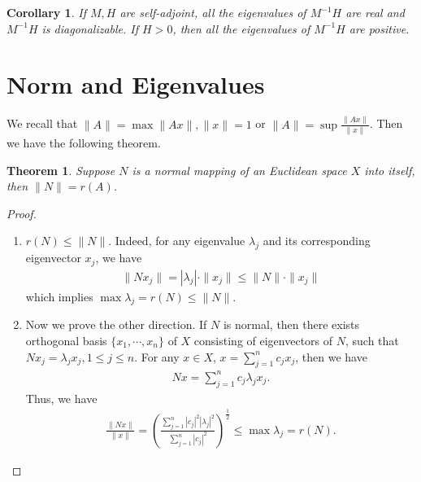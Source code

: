 \documentclass[11pt]{book}
\newtheorem{theorem}{Theorem}[section]
\newtheorem{corollary}{Corollary}[theorem]
\theoremstyle{definition}
\numberwithin{equation}{chapter}
\begin{document}
\medskip

\begin{corollary}
If $M,H$ are self-adjoint, all the eigenvalues of $M^{-1}H$ are real and $M^{-1}H$ is diagonalizable. If $H > 0$, then all the eigenvalues of $M^{-1}H$ are positive.
\end{corollary}

\medskip

\section{Norm and Eigenvalues}

We recall that $\|A\| = \max \|Ax\|, \|x\|=1$ or $\|A\| = \sup\frac{\|Ax\|}{\|x\|}$. Then we have the following theorem.

\medskip

\begin{theorem}
Suppose $N$ is a normal mapping of an Euclidean space $X$ into itself, then $\|N\| = r(A)$.
\end{theorem}
\begin{proof}
~\begin{enumerate}[label=(\alph*)]
    \item $r(N)\leq \|N\|$. Indeed, for any eigenvalue $\lambda_j$ and its corresponding eigenvector $x_j$, we have \begin{align*}
        \|Nx_j\| = |\lambda_j|\cdot \|x_j\|\leq \|N\|\cdot \|x_j\|
    \end{align*}
    which implies $\max \lambda_j = r(N) \leq \|N\|$.
    \item Now we prove the other direction. If $N$ is normal, then there exists orthogonal basis $\{x_1,\cdots, x_n\}$ of $X$ consisting of eigenvectors of $N$, such that $Nx_j = \lambda_j x_j, 1\leq j\leq n$. For any $x\in X$, $x = \sum^n_{j=1}c_j x_j$, then we have
    \begin{align*}
        Nx = \sum^n_{j=1}c_j\lambda_j x_j.
    \end{align*}
    Thus, we have
    \begin{align*}
        \frac{\|Nx\|}{\|x\|} = \left(\frac{\sum^n_{j=1} |c_j|^2 |\lambda_j|^2}{\sum^n_{j=1} |c_j|^2}\right)^{\frac{1}{2}} \leq \max \lambda_j = r(N).
    \end{align*}
\end{enumerate}
\end{proof}

\medskip
\end{document}
